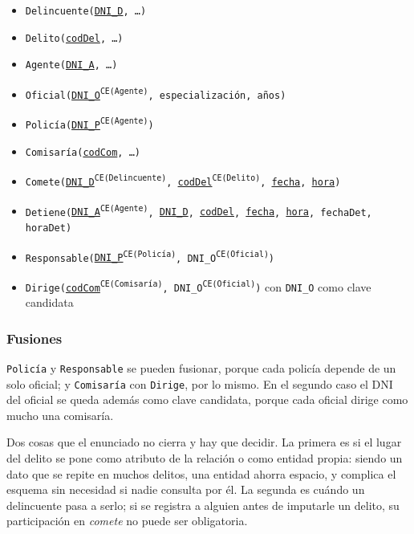 \begin{itemize}[leftmargin=*]
    \item \texttt{Delincuente(\underline{DNI\_D}, \dots)}
    \item \texttt{Delito(\underline{codDel}, \dots)}
    \item \texttt{Agente(\underline{DNI\_A}, \dots)}
    \item \texttt{Oficial(\underline{DNI\_O}\textsuperscript{CE(Agente)},
          especialización, años)}
    \item \texttt{Policía(\underline{DNI\_P}\textsuperscript{CE(Agente)})}
    \item \texttt{Comisaría(\underline{codCom}, \dots)}
    \item \texttt{Comete(\underline{DNI\_D}\textsuperscript{CE(Delincuente)},
          \underline{codDel}\textsuperscript{CE(Delito)}, \underline{fecha},
          \underline{hora})}
    \item \texttt{Detiene(\underline{DNI\_A}\textsuperscript{CE(Agente)},
          \underline{DNI\_D}, \underline{codDel}, \underline{fecha},
          \underline{hora}, fechaDet, horaDet)}
    \item \texttt{Responsable(\underline{DNI\_P}\textsuperscript{CE(Policía)},
          DNI\_O\textsuperscript{CE(Oficial)})}
    \item \texttt{Dirige(\underline{codCom}\textsuperscript{CE(Comisaría)},
          DNI\_O\textsuperscript{CE(Oficial)})} con \texttt{DNI\_O} como clave
          candidata
\end{itemize}

\subsubsection*{Fusiones}

\texttt{Policía} y \texttt{Responsable} se pueden fusionar, porque cada policía
depende de un solo oficial; y \texttt{Comisaría} con \texttt{Dirige}, por lo
mismo. En el segundo caso el DNI del oficial se queda además como clave
candidata, porque cada oficial dirige como mucho una comisaría.

Dos cosas que el enunciado no cierra y hay que decidir. La primera es si el lugar
del delito se pone como atributo de la relación o como entidad propia: siendo un
dato que se repite en muchos delitos, una entidad ahorra espacio, y complica el
esquema sin necesidad si nadie consulta por él. La segunda es cuándo un
delincuente pasa a serlo; si se registra a alguien antes de imputarle un delito,
su participación en \emph{comete} no puede ser obligatoria.

